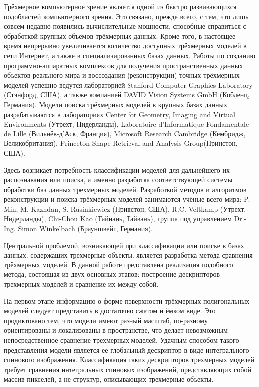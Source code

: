\documentclass[14pt]{article}
\numberwithin{figure}{section}
\numberwithin{equation}{section}
\begin{document}
Трёхмерное компьютерное зрение является одной из быстро развивающихся подобластей компьютерного зрения. Это связано, прежде всего, с тем, что лишь совсем недавно появились вычислительные мощности, способные справиться с обработкой крупных объёмов трёхмерных данных. Кроме того, в настоящее время непрерывно увеличивается количество доступных трёхмерных моделей в сети Интернет, а также в специализированных базах данных.%
Работы по созданию программно-аппаратных комплексов для получения пространственных данных объектов реального мира и воссоздания (реконструкции) точных трёхмерных моделей успешно ведутся лабораторией Stanford Computer
Graphics Laboratory (Стэнфорд, США), а также компанией DAVID Vision Systems GmbH (Кобленц, Германия). Модели поиска трёхмерных моделей в крупных базах данных разрабатываются в лабораториях Center for Geometry,
Imaging and Virtual Environments (Утрехт, Нидерланды), Laboratoire d'Informatique Fondamentale de Lille (Вильнёв-д’Аск, Франция), Microsoft Research Cambridge (Кембридж, Великобритания), Princeton Shape Retrieval
and Analysis Group(Принстон, США).%

Здесь возникает потребность классификации моделей для дальнейшего их распознавания или поиска, а именно разработка соответствующей системы обработки баз данных трехмерных моделей.%
Разработкой методов и алгоритмов реконструкции и поиска трёхмерных моделей занимаются учёные всего мира: P. Min, M. Kazhdan, S. Rusinkiewicz (Принстон, США), R.C. Veltkamp (Утрехт, Нидерланды), Chi-Chou Kao (Тайнань, Тайвань), группа под управлением Dr.-Ing. Simon Winkelbach (Брауншвейг, Германия).%

Центральной проблемой, возникающей при классификации или поиске в базах данных, содержащих трехмерные объекты, является разработка метода сравнения трёхмерных моделей. В данной работе представлена реализация подобного метода, состоящая из двух основных этапов: построение дескрипторов трехмерных моделей и сравнение их между собой.

На первом этапе информацию о форме поверхности трёхмерных полигональных моделей следует представить в достаточно сжатом и ёмком виде. Это продиктовано тем, что модели имеют разный масштаб, по-разному ориентированы и локализованы в пространстве, что делает невозможным непосредственное сравнение трехмерных моделей. Удачным способом такого представления модели является ее глобальный дескриптор в виде интегрального спинового изображения\cite{KCh}. Классификация таких дескрипторов трехмерных моделей требует сравнения интегральных спиновых изображений, представляющих собой массив пикселей, а не структур, описывающих трехмерные объекты.
\end{document}
